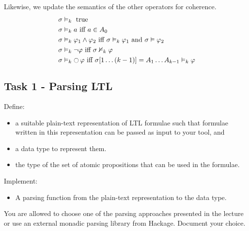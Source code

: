 \documentclass{article}
\begin{document}
Likewise, we update the semantics of the other operators for coherence.
\begin{align*}
    &\; \sigma \vDash_k \text{ true} \\
    &\; \sigma \vDash_k a \text{ iff } a \in A_0 \\
    &\; \sigma \vDash_k \varphi_1 \land \varphi_2 \text{ iff } \sigma \vDash_k \varphi_1 \text{ and } \sigma \vDash \varphi_2 \\
    &\; \sigma \vDash_k \neg \varphi \text{ iff } \sigma \nvDash_k \varphi \\
    &\; \sigma \vDash_k \mathop{\ocircle}{\varphi} \text{ iff } \sigma [1 \dots (k-1)] = A_1 \dots A_{k-1} \vDash_k \varphi \\
\end{align*}

\color{red}
\subsection*{Task 1 - Parsing LTL}
Define:
\begin{itemize}
    \item a suitable plain-text representation of LTL formulae such that formulae written in this representation can be passed as input to your tool, and
    \item a data type to represent them. 
    \item the type of the set of atomic propositions that can be used in the formulae.
\end{itemize}
Implement: 
\begin{itemize}
    \item A parsing function from the plain-text representation to the data type.
\end{itemize}
\color{black}

You are allowed to choose one of the parsing approaches presented in the lecture or 
use an external monadic parsing library from Hackage. Document your choice.

\color{red}
\end{document}
